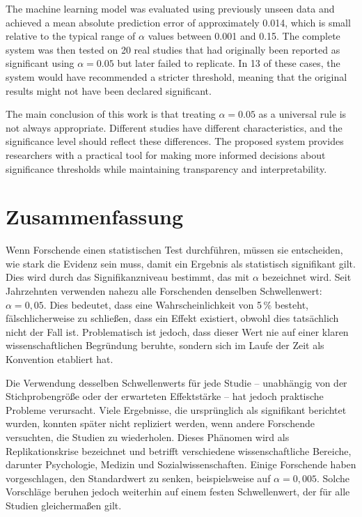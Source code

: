 	The machine learning model was evaluated using previously unseen data and achieved a mean absolute prediction error of approximately 0.014, which is small relative to the typical range of $\alpha$ values between 0.001 and 0.15. The complete system was then tested on 20 real studies that had originally been reported as significant using $\alpha = 0.05$ but later failed to replicate. In 13 of these cases, the system would have recommended a stricter threshold, meaning that the original results might not have been declared significant.
	
	The main conclusion of this work is that treating $\alpha = 0.05$ as a universal rule is not always appropriate. Different studies have different characteristics, and the significance level should reflect these differences. The proposed system provides researchers with a practical tool for making more informed decisions about significance thresholds while maintaining transparency and interpretability.
	


\clearpage

\chapter*{Zusammenfassung}

Wenn Forschende einen statistischen Test durchführen, müssen sie entscheiden, wie stark die Evidenz sein muss, damit ein Ergebnis als statistisch signifikant gilt. Dies wird durch das Signifikanzniveau bestimmt, das mit $\alpha$ bezeichnet wird. Seit Jahrzehnten verwenden nahezu alle Forschenden denselben Schwellenwert: $\alpha = 0{,}05$. Dies bedeutet, dass eine Wahrscheinlichkeit von 5\,\% besteht, fälschlicherweise zu schließen, dass ein Effekt existiert, obwohl dies tatsächlich nicht der Fall ist. Problematisch ist jedoch, dass dieser Wert nie auf einer klaren wissenschaftlichen Begründung beruhte, sondern sich im Laufe der Zeit als Konvention etabliert hat.

Die Verwendung desselben Schwellenwerts für jede Studie – unabhängig von der Stichprobengröße oder der erwarteten Effektstärke – hat jedoch praktische Probleme verursacht. Viele Ergebnisse, die ursprünglich als signifikant berichtet wurden, konnten später nicht repliziert werden, wenn andere Forschende versuchten, die Studien zu wiederholen. Dieses Phänomen wird als Replikationskrise bezeichnet und betrifft verschiedene wissenschaftliche Bereiche, darunter Psychologie, Medizin und Sozialwissenschaften. Einige Forschende haben vorgeschlagen, den Standardwert zu senken, beispielsweise auf $\alpha = 0{,}005$. Solche Vorschläge beruhen jedoch weiterhin auf einem festen Schwellenwert, der für alle Studien gleichermaßen gilt.

